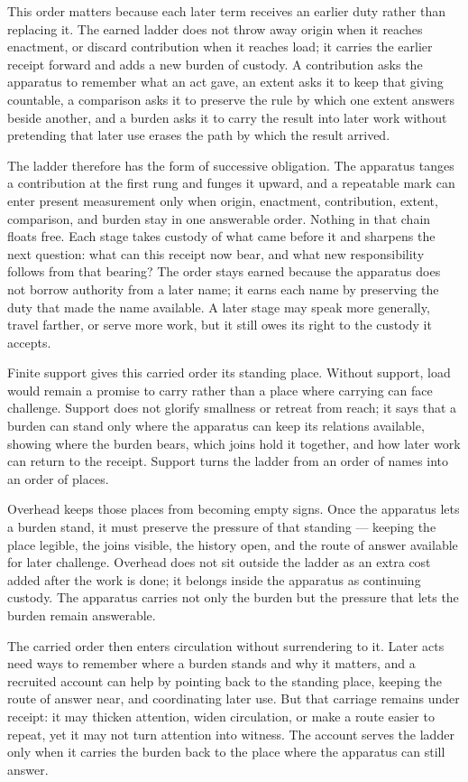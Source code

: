 This order matters because each later term receives an earlier duty rather than replacing it. The earned ladder does not throw away origin when it reaches enactment, or discard contribution when it reaches load; it carries the earlier receipt forward and adds a new burden of custody. A contribution asks the apparatus to remember what an act gave, an extent asks it to keep that giving countable, a comparison asks it to preserve the rule by which one extent answers beside another, and a burden asks it to carry the result into later work without pretending that later use erases the path by which the result arrived.

The ladder therefore has the form of successive obligation. The apparatus tanges a contribution at the first rung and funges it upward, and a repeatable mark can enter present measurement only when origin, enactment, contribution, extent, comparison, and burden stay in one answerable order. Nothing in that chain floats free. Each stage takes custody of what came before it and sharpens the next question: what can this receipt now bear, and what new responsibility follows from that bearing? The order stays earned because the apparatus does not borrow authority from a later name; it earns each name by preserving the duty that made the name available. A later stage may speak more generally, travel farther, or serve more work, but it still owes its right to the custody it accepts.

Finite support gives this carried order its standing place. Without support, load would remain a promise to carry rather than a place where carrying can face challenge. Support does not glorify smallness or retreat from reach; it says that a burden can stand only where the apparatus can keep its relations available, showing where the burden bears, which joins hold it together, and how later work can return to the receipt. Support turns the ladder from an order of names into an order of places.

Overhead keeps those places from becoming empty signs. Once the apparatus lets a burden stand, it must preserve the pressure of that standing --- keeping the place legible, the joins visible, the history open, and the route of answer available for later challenge. Overhead does not sit outside the ladder as an extra cost added after the work is done; it belongs inside the apparatus as continuing custody. The apparatus carries not only the burden but the pressure that lets the burden remain answerable.

The carried order then enters circulation without surrendering to it. Later acts need ways to remember where a burden stands and why it matters, and a recruited account can help by pointing back to the standing place, keeping the route of answer near, and coordinating later use. But that carriage remains under receipt: it may thicken attention, widen circulation, or make a route easier to repeat, yet it may not turn attention into witness. The account serves the ladder only when it carries the burden back to the place where the apparatus can still answer.

